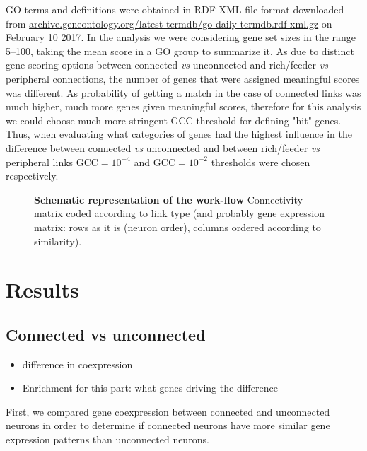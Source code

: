 \documentclass[10pt,letterpaper]{article}
\begin{document}
GO terms and definitions were obtained in RDF XML file format downloaded from \href{archive.geneontology.org/latest-termdb/go _daily-termdb.rdf-xml.gz}{archive.geneontology.org/latest-termdb/go \textunderscore daily-termdb.rdf-xml.gz} on February 10 2017. 
In the analysis we were considering gene set sizes in the range 5–100, taking the mean score in a GO group to summarize it. 
As due to distinct gene scoring options between connected \textit{vs} unconnected and rich/feeder \textit{vs} peripheral connections, the number of genes that were assigned meaningful scores was different. 
As probability of getting a match in the case of connected links was much higher, much more genes given meaningful scores, therefore for this analysis we could choose much more stringent GCC threshold for defining "hit" genes.  
Thus, when evaluating what categories of genes had the highest influence in the difference between connected \textit{vs} unconnected and between rich/feeder \textit{vs} peripheral links GCC$=10^{-4}$ and GCC$=10^{-2}$ thresholds were chosen respectively. 




 \begin{figure}[!h]
 \caption{{\bf Schematic representation of the work-flow}
Connectivity matrix coded according to link type (and probably gene expression matrix: rows as it is (neuron order), columns ordered according to similarity).}
 \label{fig:SchematicRepresentation}
 \end{figure}



\section*{Results}
\subsection*{Connected vs unconnected}

\begin{itemize}
    \item{difference in coexpression}
    \item{Enrichment for this part: what genes driving the difference}
\end{itemize} 
First, we compared gene coexpression between connected and unconnected neurons in order to determine if connected neurons have more similar gene expression patterns than unconnected neurons.
\end{document}
